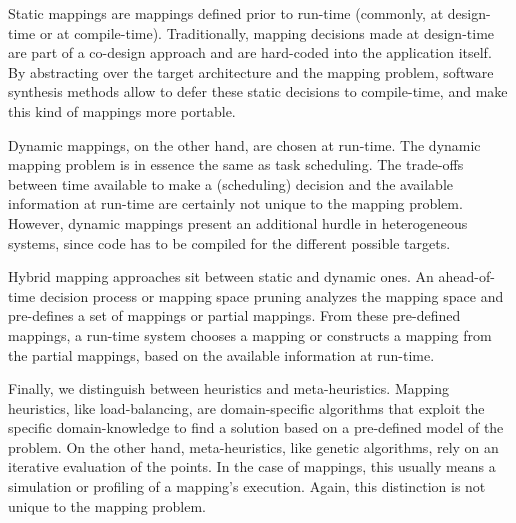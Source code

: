 Static mappings are mappings defined prior to run-time (commonly, at design-time or at compile-time).
Traditionally, mapping decisions made at design-time are part of a co-design approach and are hard-coded into the application itself.
By abstracting over the target architecture and the mapping problem, software synthesis methods allow to defer these static decisions to compile-time, and make this kind of mappings more portable.

Dynamic mappings, on the other hand, are chosen at run-time.
The dynamic mapping problem is in essence the same as task scheduling.
The trade-offs between time available to make a (scheduling) decision and the available information at run-time are certainly not unique to the mapping problem.
However, dynamic mappings present an additional hurdle in heterogeneous systems, since code has to be compiled for the different possible targets.

Hybrid mapping approaches sit between static and dynamic ones. An ahead-of-time decision process or mapping space pruning analyzes the mapping space and pre-defines a set of mappings or partial mappings.
From these pre-defined mappings, a run-time system chooses a mapping or constructs a mapping from the partial mappings, based on the available information at run-time.

Finally, we distinguish between heuristics and meta-heuristics.
Mapping heuristics, like load-balancing, are domain-specific algorithms that exploit the specific domain-knowledge to find a solution based on a pre-defined model of the problem.
On the other hand, meta-heuristics, like genetic algorithms, rely on an iterative evaluation of the points.
In the case of mappings, this usually means a simulation or profiling of a mapping's execution.
Again, this distinction is not unique to the mapping problem.